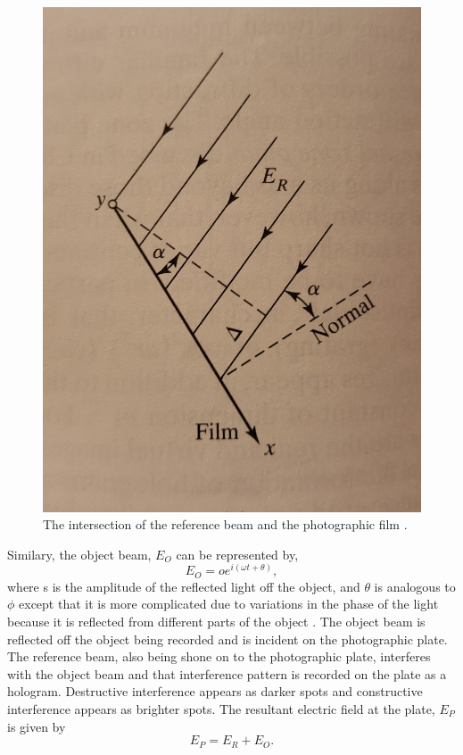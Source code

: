 \documentclass[ notitlepage, numerical, 11pt]{revtex4-1} %
\begin{document}
\begin{figure}[H]
\centerline{\includegraphics[scale = .12]{eRefMath.jpg}}
\caption{The intersection of the reference beam and the photographic film \cite{optics}.}
\label{eRefMath}
\end{figure} Similary, the object beam, $E_O$ can be represented by,
\begin{equation}
E_{O} = oe^{i(\omega t + \theta)},
\label{eObj}
\end{equation}
where s is the amplitude of the reflected light off the object, and $\theta$ is analogous to $\phi$ except that it is more complicated due to variations in the phase of the light because it is reflected from different parts of the object \cite{optics}. The object beam is reflected off the object being recorded and is incident on the photographic plate. The reference beam, also being shone on to the photographic plate, interferes with the object beam and that interference pattern is recorded on the plate as a hologram. Destructive interference appears as darker spots and constructive interference appears as brighter spots. 
The resultant electric field at the plate, $E_P$ is given by
\begin{equation}
E_{P} = E_R + E_O.
\label{Ef}
\end{equation}
\end{document}

